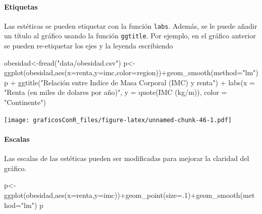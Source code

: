 \documentclass[
]{article}
\newenvironment{Shaded}{\begin{snugshade}}{\end{snugshade}}
\newcommand{\AttributeTok}[1]{\textcolor[rgb]{0.77,0.63,0.00}{#1}}
\newcommand{\DecValTok}[1]{\textcolor[rgb]{0.00,0.00,0.81}{#1}}
\newcommand{\FunctionTok}[1]{\textcolor[rgb]{0.00,0.00,0.00}{#1}}
\newcommand{\NormalTok}[1]{#1}
\newcommand{\OtherTok}[1]{\textcolor[rgb]{0.56,0.35,0.01}{#1}}
\newcommand{\SpecialCharTok}[1]{\textcolor[rgb]{0.00,0.00,0.00}{#1}}
\newcommand{\StringTok}[1]{\textcolor[rgb]{0.31,0.60,0.02}{#1}}
\numberwithin{ejcnt}{section}
\begin{document}
\hypertarget{etiquetas}{%
\paragraph{Etiquetas}\label{etiquetas}}

Las estéticas se pueden etiquetar con la función \texttt{labs}. Además, se le puede añadir un título al gráfico usando la función \texttt{ggtitle}. Por ejemplo, en el gráfico anterior se pueden re-etiquetar los ejes y la leyenda escribiendo

\begin{Shaded}
\begin{Highlighting}[]
\NormalTok{obesidad}\OtherTok{\textless{}{-}}\FunctionTok{fread}\NormalTok{(}\StringTok{"data/obesidad.csv"}\NormalTok{)}
\NormalTok{p}\OtherTok{\textless{}{-}}\FunctionTok{ggplot}\NormalTok{(obesidad,}\FunctionTok{aes}\NormalTok{(}\AttributeTok{x=}\NormalTok{renta,}\AttributeTok{y=}\NormalTok{imc,}\AttributeTok{color=}\NormalTok{region))}\SpecialCharTok{+}\FunctionTok{geom\_smooth}\NormalTok{(}\AttributeTok{method=}\StringTok{"lm"}\NormalTok{)}
\NormalTok{p }\SpecialCharTok{+} \FunctionTok{ggtitle}\NormalTok{(}\StringTok{"Relación entre Indice de Masa Corporal (IMC) y renta"}\NormalTok{) }\SpecialCharTok{+} 
        \FunctionTok{labs}\NormalTok{(}\AttributeTok{x =} \StringTok{"Renta (en miles de dolares por año)"}\NormalTok{, }\AttributeTok{y =} \FunctionTok{quote}\NormalTok{(}\FunctionTok{IMC}\NormalTok{ (kg}\SpecialCharTok{/}\NormalTok{m)), }\AttributeTok{color =} \StringTok{"Continente"}\NormalTok{)}
\end{Highlighting}
\end{Shaded}

\texttt{[image: graficosConR\_files/figure-latex/unnamed-chunk-46-1.pdf]}

\hypertarget{escalas}{%
\paragraph{Escalas}\label{escalas}}

Las escalas de las estéticas pueden ser modificadas para mejorar la claridad del gráfico.

\begin{Shaded}
\begin{Highlighting}[]
\NormalTok{p}\OtherTok{\textless{}{-}}\FunctionTok{ggplot}\NormalTok{(obesidad,}\FunctionTok{aes}\NormalTok{(}\AttributeTok{x=}\NormalTok{renta,}\AttributeTok{y=}\NormalTok{imc))}\SpecialCharTok{+}\FunctionTok{geom\_point}\NormalTok{(}\AttributeTok{size=}\NormalTok{.}\DecValTok{1}\NormalTok{)}\SpecialCharTok{+}\FunctionTok{geom\_smooth}\NormalTok{(}\AttributeTok{method=}\StringTok{"lm"}\NormalTok{)}
\NormalTok{p }
\end{Highlighting}
\end{Shaded}
\end{document}
